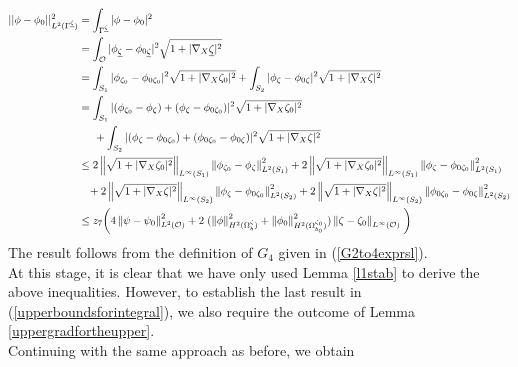 \documentclass[11pt]{article}
\begin{document}
\begin{equation*}
	\begin{split}
		||\phi-\phi_0||_{L^2(\Gamma^{\underline{\zeta}})}^2&=\displaystyle\int_{\Gamma^{\underline{\zeta}}} |\phi-\phi_0|^2\\
		&=\displaystyle\int_{\mathcal O } |\phi_{\underline{\zeta}}-\phi_{0\underline{\zeta}}|^2\sqrt{1+|\nabla_X\underline{\zeta}|^2}\\
		&=\displaystyle\int_{S_1} |\phi_{\zeta_0}-\phi_{0\zeta_0}|^2\sqrt{1+|\nabla_X\zeta_0|^2}+\displaystyle\int_{S_2} |\phi_{\zeta}-\phi_{0\zeta}|^2\sqrt{1+|\nabla_X\zeta|^2}\\
		&=\displaystyle\int_{S_1} |(\phi_{\zeta_0}-\phi_{\zeta})+(\phi_{\zeta}-\phi_{0\zeta_0})|^2\sqrt{1+|\nabla_X\zeta_0|^2}\\
		&\hspace{0.5cm}+\displaystyle\int_{S_2} |(\phi_{\zeta}-\phi_{0\zeta_0})+(\phi_{0\zeta_0}-\phi_{0\zeta})|^2\sqrt{1+|\nabla_X\zeta|^2}\\
		&\leq 2\left\Vert \sqrt{1+|\nabla_X\zeta_0|^2} \right\Vert_{L^{\infty}(S_1)} \left\Vert \phi_{\zeta_0}-\phi_{\zeta} \right\Vert_{L^{2}(S_1)}^2+2\left\Vert \sqrt{1+|\nabla_X\zeta_0|^2} \right\Vert_{L^{\infty}(S_1)} \left\Vert \phi_{\zeta}-\phi_{0\zeta_0} \right\Vert_{L^{2}(S_1)}^2\\
		&\hspace{0.3cm}+ 2\left\Vert \sqrt{1+|\nabla_X\zeta|^2} \right\Vert_{L^{\infty}(S_2)} \left\Vert \phi_{\zeta}-\phi_{0\zeta_0} \right\Vert_{L^{2}(S_2)}^2+2\left\Vert \sqrt{1+|\nabla_X\zeta|^2} \right\Vert_{L^{\infty}(S_2)} \left\Vert \phi_{0\zeta_0}-\phi_{0\zeta} \right\Vert_{L^{2}(S_2)}^2\\
		&\leq z_7\bigg(4\left\Vert \psi-\psi_0 \right\Vert_{L^{2}(\mathcal O )}^2+2\left. (\left\Vert\phi\right\Vert_{H^2(\Omega_b^{\zeta})}^2+\left\Vert\phi_0\right\Vert_{H^2(\Omega_{b_0}^{\zeta_0})}^2)\left\Vert\zeta-\zeta_0\right\Vert_{L^{\infty}(\mathcal O )}   \right.\bigg)\\
	\end{split}
\end{equation*}
The result follows from the definition of $G_4$ given in (\ref{G2to4exprsl}).\\
At this stage, it is clear that we have only used Lemma \ref{l1stab} to derive the above inequalities. However, to establish the last result in (\ref{upperboundsforintegral}), we also require the outcome of Lemma \ref{uppergradfortheupper}.\\
Continuing with the same approach as before, we obtain
\end{document}
